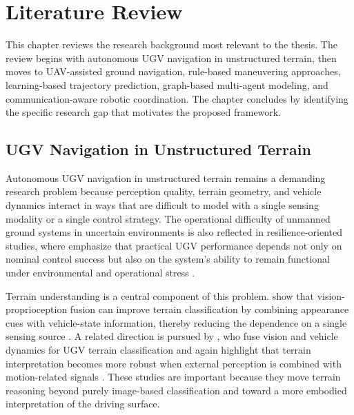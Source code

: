 
\chapter{Literature Review}
\label{ch:literature_review}

This chapter reviews the research background most relevant to the thesis. The review begins with autonomous UGV navigation in unstructured terrain, then moves to UAV-assisted ground navigation, rule-based maneuvering approaches, learning-based trajectory prediction, graph-based multi-agent modeling, and communication-aware robotic coordination. The chapter concludes by identifying the specific research gap that motivates the proposed framework.

\section{UGV Navigation in Unstructured Terrain}

Autonomous UGV navigation in unstructured terrain remains a demanding research problem because perception quality, terrain geometry, and vehicle dynamics interact in ways that are difficult to model with a single sensing modality or a single control strategy. The operational difficulty of unmanned ground systems in uncertain environments is also reflected in resilience-oriented studies, where \citeauthor{krecht2023resilience} emphasize that practical UGV performance depends not only on nominal control success but also on the system's ability to remain functional under environmental and operational stress \citep{krecht2023resilience}.

Terrain understanding is a central component of this problem. \citeauthor{chen2021cnn} show that vision-proprioception fusion can improve terrain classification by combining appearance cues with vehicle-state information, thereby reducing the dependence on a single sensing source \citep{chen2021cnn}. A related direction is pursued by \citeauthor{li2025terrainfusion}, who fuse vision and vehicle dynamics for UGV terrain classification and again highlight that terrain interpretation becomes more robust when external perception is combined with motion-related signals \citep{li2025terrainfusion}. These studies are important because they move terrain reasoning beyond purely image-based classification and toward a more embodied interpretation of the driving surface.


